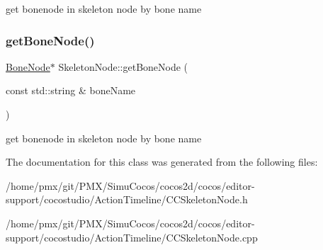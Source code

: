 get bonenode in skeleton node by bone name \mbox{\label{classSkeletonNode_a0ca6101678f33f472a52fd9cdad17066}} 
\subsubsection{\texorpdfstring{get\+Bone\+Node()}{getBoneNode()}\hspace{0.1cm}{\footnotesize\ttfamily [2/2]}}
{\footnotesize\ttfamily \hyperlink{classBoneNode}{Bone\+Node}$\ast$ Skeleton\+Node\+::get\+Bone\+Node (\begin{DoxyParamCaption}\item[{const std\+::string \&}]{bone\+Name }\end{DoxyParamCaption})}

get bonenode in skeleton node by bone name 

The documentation for this class was generated from the following files\+:\begin{DoxyCompactItemize}
\item 
/home/pmx/git/\+P\+M\+X/\+Simu\+Cocos/cocos2d/cocos/editor-\/support/cocostudio/\+Action\+Timeline/C\+C\+Skeleton\+Node.\+h\item 
/home/pmx/git/\+P\+M\+X/\+Simu\+Cocos/cocos2d/cocos/editor-\/support/cocostudio/\+Action\+Timeline/C\+C\+Skeleton\+Node.\+cpp\end{DoxyCompactItemize}
